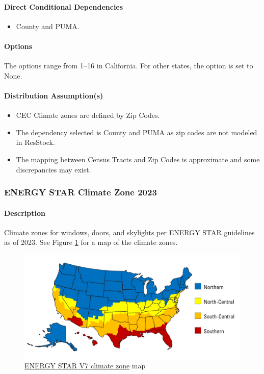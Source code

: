 \paragraph{Direct Conditional Dependencies}
\begin{itemize}
    \item County and PUMA.
\end{itemize}

\paragraph{Options}
The options range from 1--16 in California. For other states, the option is set to None.

\paragraph{Distribution Assumption(s)}
\begin{itemize}
    \item CEC Climate zones are defined by Zip Codes.
    \item The dependency selected is County and PUMA as zip codes are not modeled in ResStock.
    \item The mapping between Census Tracts and Zip Codes is approximate and some discrepancies may exist.
\end{itemize}

\subsubsection{ENERGY STAR Climate Zone 2023}
\paragraph{Description}
Climate zones for windows, doors, and skylights per ENERGY STAR guidelines as of 2023. See Figure \ref{fig:energy_star_cz} for a map of the climate zones.

\begin{figure}
    \centering
    \includegraphics[width=1\linewidth]{images/ENERGY_STAR_Climate_Zone_Map.pdf}    \caption{\href{https://www.energystar.gov/sites/default/files/asset/document/Promotional_Map.pdf}{ENERGY STAR V7 climate zone} map}
    \label{fig:energy_star_cz}
\end{figure}

